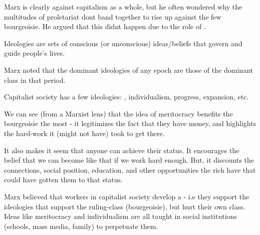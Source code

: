 Marx is clearly against capitalism as a whole, but he often wondered why the multitudes of proletariat dont band together to rise up against the few bourgeoisie. He argued that this didnt happen due to the role of .
\begin{bullets}
	\item Ideologies are sets of conscious (or unconscious) ideas/beliefs that govern and guide people's lives.
	\item Marx noted that the dominant ideologies of any epoch are those of the dominant class in that period.
\end{bullets}

Capitalist society has a few ideologies: , individualism, progress, expansion, etc.
\begin{bullets}
	\item We can see (from a Marxist lens) that the idea of meritocracy benefits the bourgeoisie the most - it legitimizes the fact that they have money, and highlights the hard-work it (might not have) took to get there.
	\item It also makes it seem that anyone can achieve their status. It encourages the belief that we can become like that if we work hard enough. But, it discounts the connections, social position, education, and other opportunities the rich have that could have gotten them to that status.
\end{bullets}

Marx believed that workers in capitalist society develop a  - i.e they support the ideologies that support the ruling-class (bourgeoisie), but hurt their own class. Ideas like meritocracy and individualism are all taught in social institutions (schools, mass media, family) to perpetuate them.

